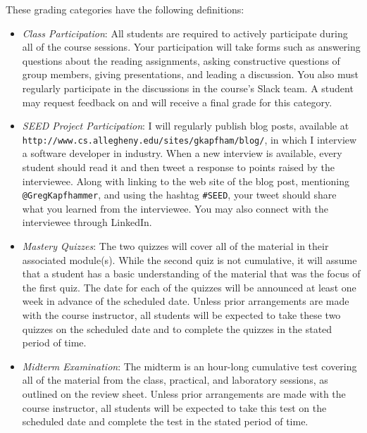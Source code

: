 \documentclass[11pt]{article}
\newcommand{\url}[1]{\lstinline{#1}}
\begin{document}
\vspace*{-.05in}

\noindent
These grading categories have the following definitions:

\vspace*{-.05in}

\begin{itemize}

  \item {\em Class Participation\/}: All students are required to actively participate during all of the course
    sessions. Your participation will take forms such as answering questions about the reading assignments, asking
    constructive questions of group members, giving presentations, and leading a discussion. You also must regularly
    participate in the discussions in the course's Slack team. A student may request feedback on and will receive a
    final grade for this category.

  \item {\em SEED Project Participation\/}: I will regularly publish blog posts, available at
    \url{http://www.cs.allegheny.edu/sites/gkapfham/blog/}, in which I interview a software developer in industry. When
    a new interview is available, every student should read it and then tweet a response to points raised by the
    interviewee. Along with linking to the web site of the blog post, mentioning \url{@GregKapfhammer}, and using the
    hashtag \url{#SEED}, your tweet should share what you learned from the interviewee. You may also connect with the
    interviewee through LinkedIn.

  \item {\em Mastery Quizzes\/}: The two quizzes will cover all of the material in their associated module(s). While the
    second quiz is not cumulative, it will assume that a student has a basic understanding of the material that was the
    focus of the first quiz. The date for each of the quizzes will be announced at least one week in advance of the
    scheduled date. Unless prior arrangements are made with the course instructor, all students will be expected to take
    these two quizzes on the scheduled date and to complete the quizzes in the stated period of time.

  \item {\em Midterm Examination\/}: The midterm is an hour-long cumulative test covering all of the material from the
    class, practical, and laboratory sessions, as outlined on the review sheet. Unless prior arrangements are made with
    the course instructor, all students will be expected to take this test on the scheduled date and complete the test
    in the stated period of time.


\end{itemize}
\end{document}
